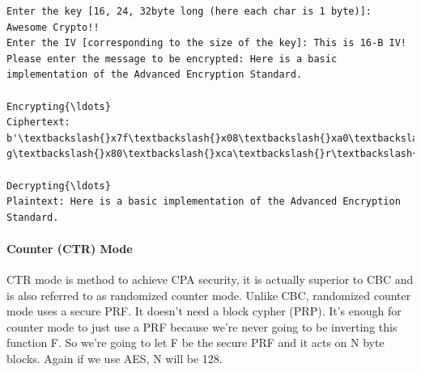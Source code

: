 \documentclass[11pt]{article}
\begin{document}
    \begin{Verbatim}[commandchars=\\\{\}]
Enter the key [16, 24, 32byte long (here each char is 1 byte)]: Awesome Crypto!!
Enter the IV [corresponding to the size of the key]: This is 16-B IV!
Please enter the message to be encrypted: Here is a basic implementation of the Advanced Encryption Standard.

Encrypting{\ldots}
Ciphertext: b'\textbackslash{}x7f\textbackslash{}x08\textbackslash{}xa0\textbackslash{}x10\textbackslash{}xd1l\textbackslash{}xa3\textbackslash{}xe5\textbackslash{}xc7x\textbackslash{}x98\textbackslash{}xe1\textbackslash{}xf1\textbackslash{}xf5\textbackslash{}x90H'b'\textbackslash{}x8f\textbackslash{}xd3 g\textbackslash{}x80\textbackslash{}xca\textbackslash{}r\textbackslash{}x11\textbackslash{}xb6\textbackslash{}x9d9\textbackslash{}xd1\textbackslash{}xfc\textbackslash{}xa5t\textbackslash{}xd7'b"h\textbackslash{}x88\textbackslash{}xef\textbackslash{}xf1S\textbackslash{}x8a\textbackslash{}xea\textbackslash{}x8f.\textbackslash{}xcb/\textbackslash{}xc3h\textbackslash{}xff'\textbackslash{}x1d"b'\textbackslash{}xd2\textbackslash{}xbc\textbackslash{}x80=S\textbackslash{}xda\#\textbackslash{}x8dI\textbackslash{}x0e\textbackslash{}xa2\textbackslash{}xeb\textbackslash{}x1b\textbackslash{}xd5F\textbackslash{}x8a'b'\textbackslash{}x1b\textbackslash{}xf6\textbackslash{}x1f\textbackslash{}x9dSn\^{}\textbackslash{}xf1\textbackslash{}x9b\textbackslash{}x0ei\textbackslash{}x19\&\textbackslash{}x80\textbackslash{}x0f\textbackslash{}x1d'

Decrypting{\ldots}
Plaintext: Here is a basic implementation of the Advanced Encryption Standard.

    \end{Verbatim}

    \hypertarget{counter-ctr-mode}{%
\paragraph{Counter (CTR) Mode}\label{counter-ctr-mode}}

CTR mode is method to achieve CPA security, it is actually superior to
CBC and is also referred to as randomized counter mode. Unlike CBC,
randomized counter mode uses a secure PRF. It doesn't need a block
cypher (PRP). It's enough for counter mode to just use a PRF because
we're never going to be inverting this function F. So we're going to let
F be the secure PRF and it acts on N byte blocks. Again if we use AES, N
will be 128.
\end{document}
